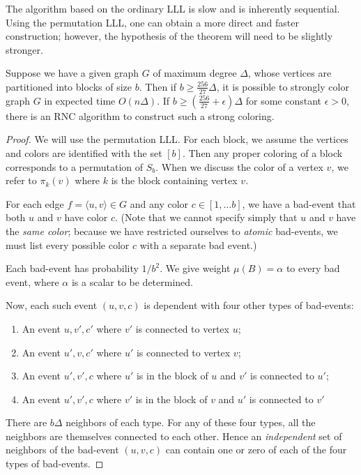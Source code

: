 The algorithm based on the ordinary LLL is slow and is inherently sequential. Using the permutation LLL, one can obtain a more direct and faster construction; however, the hypothesis of the theorem will need to be slightly stronger.
\begin{theorem}
Suppose we have a given graph $G$ of maximum degree $\Delta$, whose vertices are partitioned into blocks of size $b$. Then if $b \geq \frac{256}{27} \Delta$, it is possible to strongly color graph $G$ in expected time $O(n \Delta)$. If $b \geq (\frac{256}{27} + \epsilon) \Delta$ for some constant $\epsilon > 0$, there is an RNC algorithm to construct such a strong coloring. 
\end{theorem}
\begin{proof}
We will use the permutation LLL. For each block, we assume the vertices and colors are identified with the set $[b]$. Then any proper coloring of a block corresponds to a permutation of $S_b$. When we discuss the color of a vertex $v$, we refer to $\pi_k(v)$ where $k$ is the block containing vertex $v$.

For each edge $f = \langle u, v \rangle \in G$ and any color $c \in [1, \dots b]$, we have a bad-event that both $u$ and $v$ have color $c$. (Note that we cannot specify simply that $u$ and $v$ have the \emph{same color}; because we have restricted ourselves to \emph{atomic} bad-events, we must list every possible color $c$ with a separate bad event.)

Each bad-event has probability $1/b^2$. We give weight $\mu(B) = \alpha$ to every bad event, where $\alpha$ is a scalar to be determined. 

Now, each such event $(u,v,c)$ is dependent with four other types of bad-events:
\begin{enumerate}
\item An event $u, v', c'$ where $v'$ is connected to vertex $u$;
\item An event $u', v, c'$ where $u'$ is connected to vertex $v$;
\item An event $u', v', c$ where $u'$ is in the block of $u$ and $v'$ is connected to $u'$;
\item An event $u', v', c$ where $v'$ is in the block of $v$ and $u'$ is connected to $v'$
\end{enumerate}

 There are $b \Delta$ neighbors of each type.  For any of these four types, all the neighbors are themselves connected to each other. Hence an \emph{independent} set of neighbors of the bad-event $(u,v,c)$ can contain one or zero of each of the four types of bad-events. 


\end{proof}
